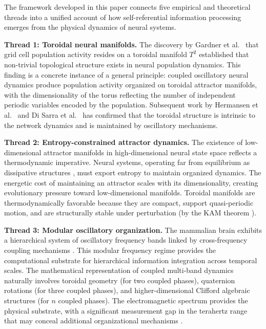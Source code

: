 \documentclass[12pt,a4paper]{article}
\begin{document}
The framework developed in this paper connects five empirical and theoretical threads into a unified account of how self-referential information processing emerges from the physical dynamics of neural systems.

\textbf{Thread 1: Toroidal neural manifolds.}
The discovery by Gardner et al.\ \cite{Gardner2022} that grid cell population activity resides on a toroidal manifold $T^2$ established that non-trivial topological structure exists in neural population dynamics.
This finding is a concrete instance of a general principle: coupled oscillatory neural dynamics produce population activity organized on toroidal attractor manifolds, with the dimensionality of the torus reflecting the number of independent periodic variables encoded by the population.
Subsequent work by Hermansen et al.\ \cite{Hermansen2024} and Di Sarra et al.\ \cite{DiSarra2025} has confirmed that the toroidal structure is intrinsic to the network dynamics and is maintained by oscillatory mechanisms.

\textbf{Thread 2: Entropy-constrained attractor dynamics.}
The existence of low-dimensional attractor manifolds in high-dimensional neural state space reflects a thermodynamic imperative.
Neural systems, operating far from equilibrium as dissipative structures \cite{Prigogine1977}, must export entropy to maintain organized dynamics.
The energetic cost of maintaining an attractor scales with its dimensionality, creating evolutionary pressure toward low-dimensional manifolds.
Toroidal manifolds are thermodynamically favorable because they are compact, support quasi-periodic motion, and are structurally stable under perturbation (by the KAM theorem \cite{Kolmogorov1954, Arnold1963, Moser1962}).

\textbf{Thread 3: Modular oscillatory organization.}
The mammalian brain exhibits a hierarchical system of oscillatory frequency bands linked by cross-frequency coupling mechanisms \cite{Buzsaki2006, Canolty2006}.
This modular frequency regime provides the computational substrate for hierarchical information integration across temporal scales.
The mathematical representation of coupled multi-band dynamics naturally involves toroidal geometry (for two coupled phases), quaternion rotations (for three coupled phases), and higher-dimensional Clifford algebraic structures (for $n$ coupled phases).
The electromagnetic spectrum provides the physical substrate, with a significant measurement gap in the terahertz range that may conceal additional organizational mechanisms \cite{Frohlich1968, Markelz2008}.
\end{document}
